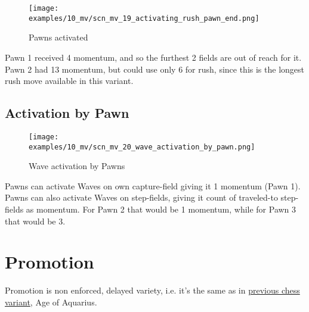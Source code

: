 \clearpage %

\noindent
\begin{figure}[!h]
\texttt{[image: examples/10\_mv/scn\_mv\_19\_activating\_rush\_pawn\_end.png]}
\caption{Pawns activated}
\label{fig:scn_mv_19_activating_rush_pawn_end}
\end{figure}

Pawn 1 received 4 momentum, and so the furthest 2 fields are out of reach for it.
Pawn 2 had 13 momentum, but could use only 6 for rush, since this is the longest
rush move available in this variant.

\clearpage %

\subsection*{Activation by Pawn}

\noindent
\begin{figure}[!h]
\texttt{[image: examples/10\_mv/scn\_mv\_20\_wave\_activation\_by\_pawn.png]}
\caption{Wave activation by Pawns}
\label{fig:scn_mv_20_wave_activation_by_pawn}
\end{figure}

Pawns can activate Waves on own capture-field giving it 1 momentum (Pawn 1).
Pawns can also activate Waves on step-fields, giving it count of traveled-to
step-fields as momentum. For Pawn 2 that would be 1 momentum, while for Pawn 3
that would be 3.

\clearpage %

\section*{Promotion}

Promotion is non enforced, delayed variety, i.e. it's the same as in
\hyperref[sec:Age of Aquarius/Promotion]{previous chess variant}, Age of Aquarius.

